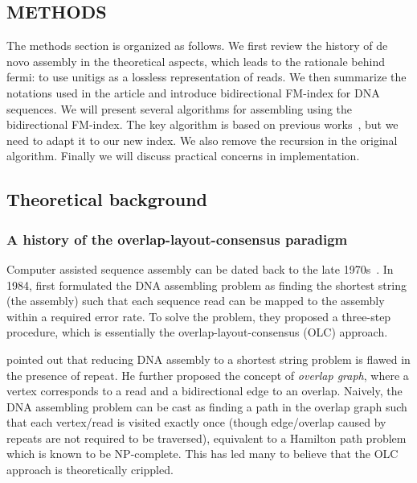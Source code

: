 \documentclass{bioinfo}
\begin{document}
\begin{methods}
\section{METHODS}

The methods section is organized as follows. We first review the history
of de novo assembly in the theoretical aspects, which leads to the rationale
behind fermi: to use unitigs as a lossless representation of reads. We then
summarize the notations used in the article and introduce bidirectional
FM-index for DNA sequences. We will present several algorithms for assembling
using the bidirectional FM-index. The key algorithm is based on previous
works~\citep{Simpson:2010uq}, but we need to adapt it to our new index. We
also remove the recursion in the original algorithm. Finally we will discuss
practical concerns in implementation.

\subsection{Theoretical background}
\subsubsection{A history of the overlap-layout-consensus paradigm}
Computer assisted sequence assembly can be dated back to the late
1970s~\citep{Staden:1979dq,Gingeras:1979cr}. 
In 1984, \citeauthor{Peltola:1984qf} first formulated the DNA assembling
problem as finding the shortest string (the assembly) such that each sequence
read can be mapped to the assembly within a required error rate.
To solve the problem, they proposed a three-step procedure, which is
essentially the overlap-layout-consensus (OLC) approach.

\citet{Myers:1995nx} pointed out that reducing DNA assembly to a shortest
string problem is flawed in the presence of repeat. He further proposed the
concept of \emph{overlap graph}, where a vertex corresponds to a read and a
bidirectional edge to an overlap. Naively, the DNA assembling problem can be
cast as finding a path in the overlap graph such that each vertex/read is
visited exactly once (though edge/overlap caused by repeats are not required to
be traversed), equivalent to a Hamilton path problem which is known to be
NP-complete. This has led many to believe that the OLC approach is
theoretically crippled.


\end{methods}
\end{document}
